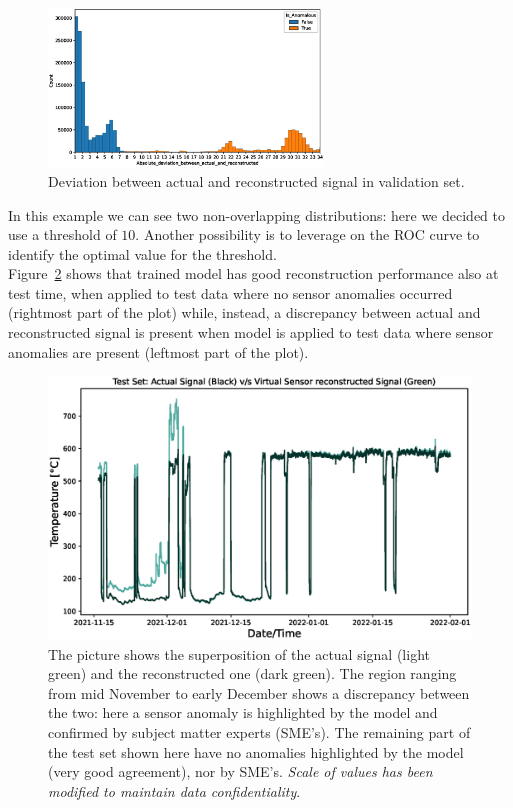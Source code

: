 \documentclass[runningheads]{llncs}
\begin{document}
\begin{figure}[h]
\centering
\includegraphics[width=0.65\textwidth]{deviation_plot.eps}
\caption{Deviation between actual and reconstructed signal in validation set.} \label{threshold}
\end{figure}


In this example we can see two non-overlapping distributions: here we decided to use a threshold of $10$. Another possibility is to leverage on the ROC curve to identify the optimal value for the threshold. \\
Figure~\ref{inference} shows that trained model has good reconstruction performance also at test time, when applied to test data where no sensor anomalies occurred (rightmost part of the plot) while, instead, a discrepancy between actual and reconstructed signal is present when model is applied to test data where sensor anomalies are present (leftmost part of the plot).

\begin{figure}[h]
\centering
\includegraphics[width=\textwidth]{test_plot.eps}
\caption{The picture shows the superposition of the actual signal (light green) and the reconstructed one (dark green). The region ranging from mid November to early December shows a discrepancy between the two: here a sensor anomaly is highlighted by the model and confirmed by subject matter experts (SME's).
The remaining part of the test set shown here have no anomalies highlighted by the model (very good agreement), nor by SME's. \textit{Scale of values has been modified to maintain data confidentiality}.}\label{inference}
\end{figure}
\end{document}
